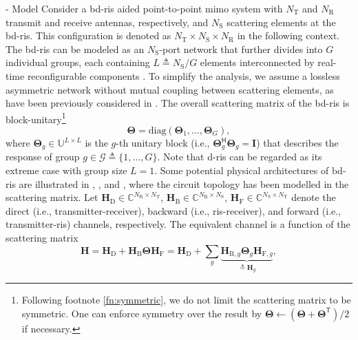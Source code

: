 \documentclass[journal]{IEEEtran}
\begin{document}
\begin{section}{- Model}
	Consider a \gls{bd}-\gls{ris} aided point-to-point \gls{mimo} system with $N_\mathrm{T}$ and $N_\mathrm{R}$ transmit and receive antennas, respectively, and $N_\mathrm{S}$ scattering elements at the \gls{bd}-\gls{ris}.
	This configuration is denoted as $N_\mathrm{T} \times N_\mathrm{S} \times N_\mathrm{R}$ in the following context.
	The \gls{bd}-\gls{ris} can be modeled as an $N_\mathrm{S}$-port network \cite{Ivrlac2010} that further divides into $G$ individual groups, each containing $L \triangleq N_\mathrm{S} / G$ elements interconnected by real-time reconfigurable components \cite{Shen2020a}.
	To simplify the analysis, we assume a lossless asymmetric network without mutual coupling between scattering elements, as have been previously considered in \cite{Li2023b,Li2023c,Bartoli2023}.
	The overall scattering matrix of the \gls{bd}-\gls{ris} is block-unitary\footnote{Following footnote \ref{fn:symmetric}, we do not limit the scattering matrix to be symmetric. One can enforce symmetry over the result by $\mathbf{\Theta} \gets (\mathbf{\Theta} + \mathbf{\Theta}^\mathsf{T})/2$ if necessary.}
	\begin{equation}
		\mathbf{\Theta} = \mathrm{diag}(\mathbf{\Theta}_1,\ldots,\mathbf{\Theta}_G),
		\label{eq:bd_ris}
	\end{equation}
	where $\mathbf{\Theta}_g \in \mathbb{U}^{L \times L}$ is the $g$-th unitary block (i.e., $\mathbf{\Theta}_g^\mathsf{H} \mathbf{\Theta}_g = \mathbf{I}$) that describes the response of group $g \in \mathcal{G} \triangleq \{1, \ldots, G\}$.
	Note that \gls{d}-\gls{ris} can be regarded as its extreme case with group size $L=1$.
	Some potential physical architectures of \gls{bd}-\gls{ris} are illustrated in \cite[Fig. 3]{Shen2020a}, \cite[Fig. 5]{Li2023c}, and \cite[Fig. 2]{Nerini2024}, where the
	circuit topology has been modelled in the scattering matrix.
	Let $\mathbf{H}_\mathrm{D} \in \mathbb{C}^{N_\mathrm{R} \times N_\mathrm{T}}$, $\mathbf{H}_\mathrm{B} \in \mathbb{C}^{N_\mathrm{R} \times N_\mathrm{S}}$, $\mathbf{H}_\mathrm{F} \in \mathbb{C}^{N_\mathrm{S} \times N_\mathrm{T}}$ denote the direct (i.e., transmitter-receiver), backward (i.e., \gls{ris}-receiver), and forward (i.e., transmitter-\gls{ris}) channels, respectively.
	The equivalent channel is a function of the scattering matrix
	\begin{equation}
		\mathbf{H} = \mathbf{H}_\mathrm{D} + \mathbf{H}_\mathrm{B} \mathbf{\Theta} \mathbf{H}_\mathrm{F} = \mathbf{H}_\mathrm{D} + \sum_g \underbrace{\mathbf{H}_{\mathrm{B},g} \mathbf{\Theta}_g \mathbf{H}_{\mathrm{F},g}}_{\triangleq \mathbf{H}_g},

\end{equation}
\end{section}
\end{document}
